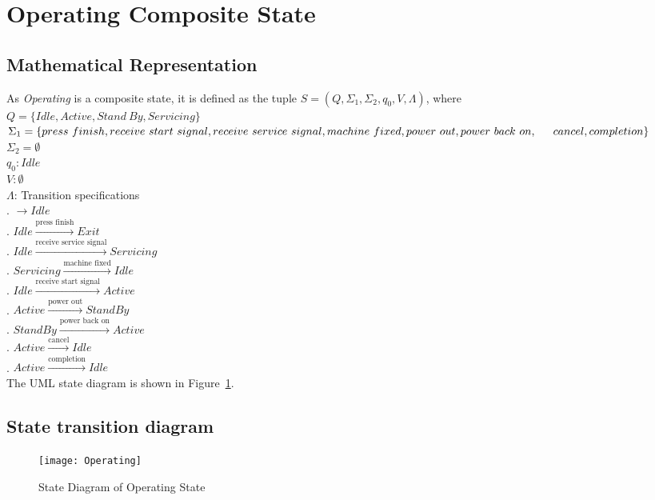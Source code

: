 \newpage
\section{Operating Composite State}

\subsection{Mathematical Representation}

\noindent As \textit{Operating} is a composite state, it is defined as the tuple $S = (Q, \Sigma_1, \Sigma_2, q_0, V, \Lambda)$, where\\

\noindent $Q = \{Idle, Active, Stand~By, Servicing\}$\\
\noindent $\Sigma_1 = \{press~finish, receive~start~signal, receive~service ~signal, machine~fixed, power~out, power~back~on, \\
\indent cancel, completion\}$\\
\noindent $\Sigma_2 = \emptyset$\\
\noindent $q_0: Idle$\\
\noindent $V: \emptyset$\\
\noindent $\Lambda$: Transition specifications\\
. $\rightarrow Idle$\\
. $Idle \xrightarrow {\text {press finish}} Exit$\\
. $Idle \xrightarrow {\text {receive service signal}} Servicing$\\
. $Servicing \xrightarrow {\text {machine fixed}} Idle$\\
. $Idle \xrightarrow {\text {receive start signal}} Active$\\
. $Active \xrightarrow {\text {power out}} StandBy$\\
. $StandBy \xrightarrow {\text {power back on}} Active$\\
. $Active \xrightarrow {\text {cancel}} Idle$\\
. $Active \xrightarrow {\text {completion}} Idle$\\

\noindent The UML state diagram is shown in Figure~\ref{fig:operating}.

\newpage

\subsection{State transition diagram}

\begin{figure}[h!]
	\centering
		\texttt{[image: Operating]}
		  \caption{State Diagram of Operating State}
  \label{fig:operating}
\end{figure}
